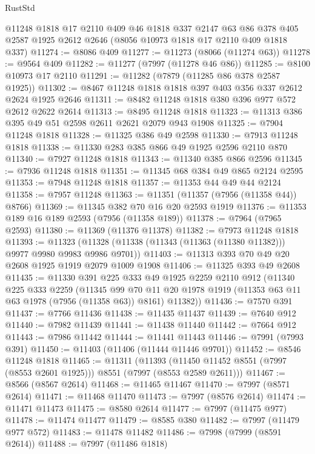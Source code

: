\begin{lexlean}{RustStd}
\begin{coremodule}
{\begin{coremodule}
{{{{{{{{{{{{{{{{{{{{{{{{{{{{{{{{{{{{{{{{{{{    @11248
    @1818
    @17
    @2110
    @409
    @46
    @1818
    @337
    @2147
    @63
    @86
    @378
    @405
    @2587
    @1925
    @2612
    @2646
    (@8056 @10973 @1818 @17 @2110 @409 @1818 @337)
@11274 := @8086 @409
@11277 := @11273 (@8066 (@11274 @63))
@11278 := @9564 @409
@11282 := @11277 (@7997 (@11278 @46 @86))
@11285 := @8100 @10973 @17 @2110
@11291 := @11282 (@7879 (@11285 @86 @378 @2587 @1925))
@11302 := @8467 @11248 @1818 @1818 @397 @403 @356 @337 @2612 @2624 @1925 @2646
@11311 := @8482 @11248 @1818 @380 @396 @977 @572 @2612 @2622 @2614
@11313 := @8495 @11248 @1818
@11323 := @11313 @386 @395 @49 @51 @2598 @2611 @2621 @2079 @943 @1908
@11325 := @7904 @11248 @1818
@11328 := @11325 @386 @49 @2598
@11330 := @7913 @11248 @1818
@11338 := @11330 @283 @385 @866 @49 @1925 @2596 @2110 @870
@11340 := @7927 @11248 @1818
@11343 := @11340 @385 @866 @2596
@11345 := @7936 @11248 @1818
@11351 := @11345 @68 @384 @49 @865 @2124 @2595
@11353 := @7948 @11248 @1818
@11357 := @11353 @44 @49 @44 @2124
@11358 := @7957 @11248
@11363 := @11351 (@11357 (@7956 (@11358 @44)) @8766)
@11369 := @11345 @382 @70 @16 @20 @2593 @1919
@11376 := @11353 @189 @16 @189 @2593 (@7956 (@11358 @189))
@11378 := @7964 (@7965 @2593)
@11380 := @11369 (@11376 @11378)
@11382 := @7973 @11248 @1818
@11393 := @11323 (@11328 (@11338 (@11343 (@11363 (@11380 @11382))) @9977 @9980 @9983 @9986 @9701))
@11403 := @11313 @393 @70 @49 @20 @2608 @1925 @1919 @2079 @1009 @1908
@11406 := @11325 @393 @49 @2608
@11435 := @11330
    @391
    @225
    @333
    @49
    @1925
    @2259
    @2110
    @912
    (@11340
      @225
      @333
      @2259
      (@11345
        @99
        @70
        @11
        @20
        @1978
        @1919
        (@11353 @63 @11 @63 @1978 (@7956 (@11358 @63)) @8161)
        @11382))
@11436 := @7570 @391
@11437 := @7766 @11436
@11438 := @11435 @11437
@11439 := @7640 @912
@11440 := @7982 @11439
@11441 := @11438 @11440
@11442 := @7664 @912
@11443 := @7986 @11442
@11444 := @11441 @11443
@11446 := @7991 (@7993 @391)
@11450 := @11403 (@11406 (@11444 @11446 @9701))
@11452 := @8546 @11248 @1818
@11465 := @11311
    (@11393 (@11450 @11452 @8551 (@7997 (@8553 @2601 @1925))) @8551 (@7997 (@8553 @2589 @2611)))
@11467 := @8566 (@8567 @2614)
@11468 := @11465 @11467
@11470 := @7997 (@8571 @2614)
@11471 := @11468 @11470
@11473 := @7997 (@8576 @2614)
@11474 := @11471 @11473
@11475 := @8580 @2614
@11477 := @7997 (@11475 @977)
@11478 := @11474 @11477
@11479 := @8585 @380
@11482 := @7997 (@11479 @977 @572)
@11483 := @11478 @11482
@11486 := @7998 (@7999 (@8591 @2614))
@11488 := @7997 (@11486 @1818)
}}}}}}}}}}}}}}}}}}}}}}}}}}}}}}}}}}}}}}}}}}}
\end{coremodule}}
\end{coremodule}
\end{lexlean}
